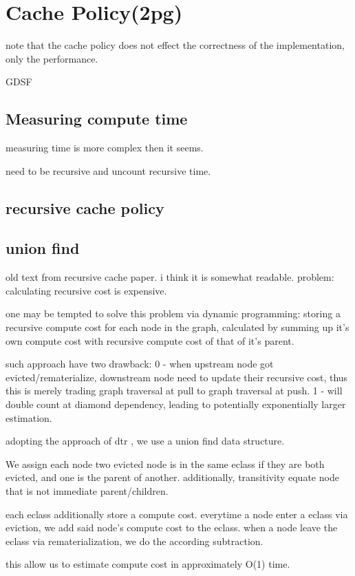 \section{Cache Policy(2pg)}
note that the cache policy does not effect the correctness of the implementation, only the performance.

GDSF
\subsection{Measuring compute time}
measuring time is more complex then it seems.

need to be recursive and uncount recursive time.

\subsection{recursive cache policy}
\subsection{union find}
\pavel old text from recursive cache paper. i think it is somewhat readable.
problem: calculating recursive cost is expensive.

one may be tempted to solve this problem via dynamic programming: storing a recursive compute cost for each node in the graph,
calculated by summing up it's own compute cost with recursive compute cost of that of it's parent.

such approach have two drawback:
0 - when upstream node got evicted/rematerialize, downstream node need to update their recursive cost, 
thus this is merely trading graph traversal at pull to graph traversal at push.
1 - will double count at diamond dependency, leading to potentially exponentially larger estimation.

adopting the approach of dtr , we use a union find data structure. 

We assign each node 
two evicted node is in the same eclass if they are both evicted, and one is the parent of another. additionally, transitivity equate node that is not immediate parent/children. 

each eclass additionally store a compute cost. everytime a node enter a eclass via eviction, we add said node's compute cost to the eclass.
when a node leave the eclass via rematerialization, we do the according subtraction.

this allow us to estimate compute cost in approximately O(1) time.